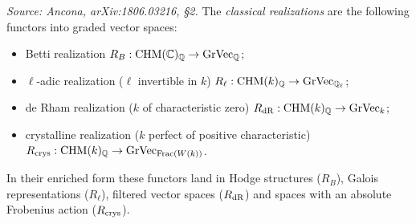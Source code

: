 \begin{definition}
  \label{def:realizations}
  \textit{Source: Ancona, arXiv:1806.03216, §2.}
  The \emph{classical realizations} are the following functors into graded vector
  spaces:
  \begin{itemize}
    \item Betti realization \(R_B : \mathrm{CHM}(\mathbb{C})_{\mathbb{Q}} \to \mathrm{GrVec}_{\mathbb{Q}}\);
    \item \(\ell\)-adic realization (\(\ell\) invertible in \(k\))
      \(R_\ell : \mathrm{CHM}(k)_{\mathbb{Q}} \to \mathrm{GrVec}_{\mathbb{Q}_\ell}\);
    \item de Rham realization (\(k\) of characteristic zero)
      \(R_{\mathrm{dR}} : \mathrm{CHM}(k)_{\mathbb{Q}} \to \mathrm{GrVec}_{k}\);
    \item crystalline realization (\(k\) perfect of positive characteristic)
      \(R_{\mathrm{crys}} : \mathrm{CHM}(k)_{\mathbb{Q}} \to \mathrm{GrVec}_{\mathrm{Frac}(W(k))}\).
  \end{itemize}
  In their enriched form these functors land in Hodge structures (\(R_B\)),
  Galois representations (\(R_\ell\)), filtered vector spaces (\(R_{\mathrm{dR}}\)) and
  spaces with an absolute Frobenius action (\(R_{\mathrm{crys}}\)).
\end{definition}

